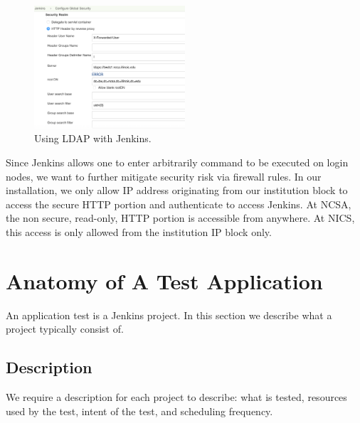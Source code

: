 \documentclass[10pt, conference, compsocconf]{IEEEtran}
\begin{document}
{\begin{figure}
\centering
\includegraphics[width=0.5\textwidth]{LDAP-Jenkins}
\caption{Using LDAP with Jenkins.}
\label{fig:LDAP-Jenkins}
\end{figure}

Since Jenkins allows one to enter arbitrarily command to be executed on login nodes, we want to further mitigate security risk via firewall rules. 
In our installation, we only allow IP address originating from our institution block to access the secure HTTP portion and authenticate to access Jenkins. 
At NCSA, the non secure, read-only, HTTP portion is accessible from anywhere. 
At NICS, this access is only allowed from the institution IP block only. 


\section{Anatomy of A Test Application}
\label{sec:TestAnatomy}
An application test is a Jenkins project. In this section we describe what a project typically consist of. 


\subsection{Description}
We require a description for each project to describe: what is tested, resources used by the test, intent of the test, and scheduling frequency.

}
\end{document}
